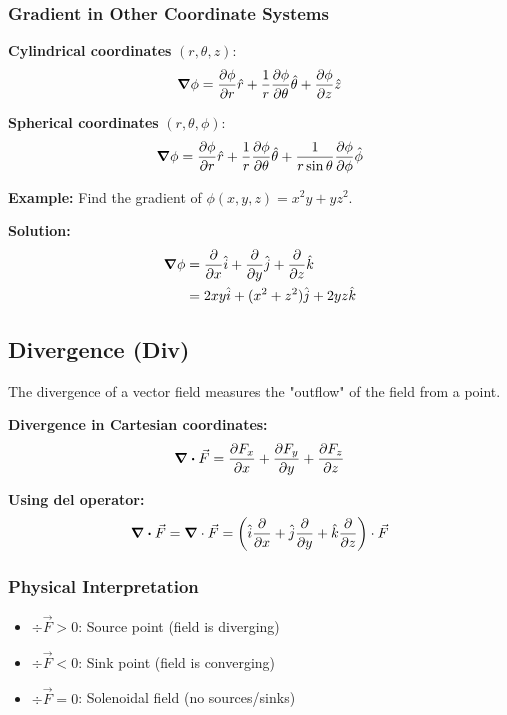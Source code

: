\documentclass[12pt,a4paper]{article}
\begin{document}
\subsubsection{Gradient in Other Coordinate Systems}
\begin{formulabox}
\textbf{Cylindrical coordinates} $(r, \theta, z)$:
\begin{equation}
\grad \phi = \pdv{\phi}{r}\hat{r} + \frac{1}{r}\pdv{\phi}{\theta}\hat{\theta} + \pdv{\phi}{z}\hat{z}
\end{equation}

\textbf{Spherical coordinates} $(r, \theta, \phi)$:
\begin{equation}
\grad \phi = \pdv{\phi}{r}\hat{r} + \frac{1}{r}\pdv{\phi}{\theta}\hat{\theta} + \frac{1}{r\sin\theta}\pdv{\phi}{\phi}\hat{\phi}
\end{equation}
\end{formulabox}

\begin{examplebox}
\textbf{Example:} Find the gradient of $\phi(x,y,z) = x^2y + yz^2$.

\textbf{Solution:}
\begin{align}
\grad\phi &= \pdv{}{x}(x^2y + yz^2)\hat{i} + \pdv{}{y}(x^2y + yz^2)\hat{j} + \pdv{}{z}(x^2y + yz^2)\hat{k} \\
&= 2xy\hat{i} + (x^2 + z^2)\hat{j} + 2yz\hat{k}
\end{align}
\end{examplebox}

\subsection{Divergence (Div)}
The divergence of a vector field measures the "outflow" of the field from a point.

\begin{formulabox}
\textbf{Divergence in Cartesian coordinates:}
\begin{equation}
\div \vec{F} = \pdv{F_x}{x} + \pdv{F_y}{y} + \pdv{F_z}{z}
\end{equation}

\textbf{Using del operator:}
\begin{equation}
\div \vec{F} = \grad \cdot \vec{F} = \left(\hat{i}\pdv{}{x} + \hat{j}\pdv{}{y} + \hat{k}\pdv{}{z}\right) \cdot \vec{F}
\end{equation}
\end{formulabox}

\subsubsection{Physical Interpretation}
\begin{itemize}
    \item $\div \vec{F} > 0$: Source point (field is diverging)
    \item $\div \vec{F} < 0$: Sink point (field is converging)
    \item $\div \vec{F} = 0$: Solenoidal field (no sources/sinks)
\end{itemize}
\end{document}
